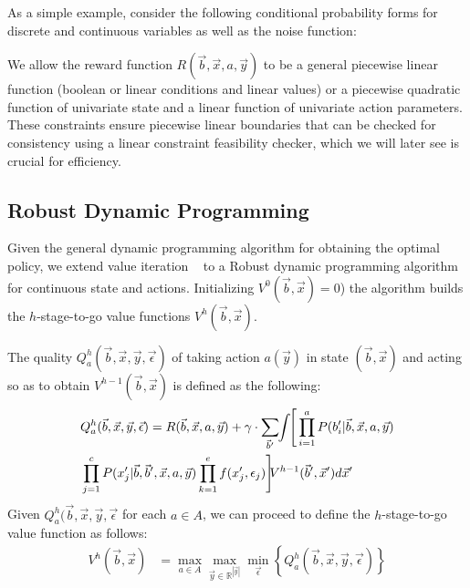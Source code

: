 As a simple example, consider the following conditional probability forms for discrete and continuous variables as well as the noise function: 

We allow the reward function $R(\vec{b},\vec{x},a,\vec{y})$ to be a general piecewise linear function (boolean or linear conditions
and linear values) or a piecewise quadratic function of univariate state and a linear function of univariate action parameters. 
These constraints ensure piecewise linear boundaries that can be checked for consistency using a linear constraint feasibility checker, which we will later see is crucial for efficiency.

\subsection{Robust Dynamic Programming}

Given the general dynamic programming algorithm for obtaining the optimal policy, we extend value iteration ~\cite{bellman} to a Robust dynamic programming algorithm for continuous state and actions. Initializing $V^0(\vec{b},\vec{x}) = 0$) the algorithm builds the $h$-stage-to-go value functions $V^h(\vec{b},\vec{x})$.

The quality $Q_a^{h}(\vec{b},\vec{x},\vec{y},\vec{\epsilon})$ of taking action $a(\vec{y})$ in state $(\vec{b},\vec{x})$ and acting so as to obtain $V^{h-1}(\vec{b},\vec{x})$ is defined as the following:
\vspace{-4mm}
{\footnotesize
\begin{align}
& Q_a^{h}(\vec{b},\vec{x},\vec{y},\vec{\epsilon}) = R(\vec{b},\vec{x},a,\vec{y}) + \gamma \cdot \sum_{\vec{b}'} \hspace{-1.0mm} \int \hspace{-1.0mm} \Bigg[ \prod_{i=1}^a P(b_i'|\vec{b},\vec{x},a,\vec{y})     \nonumber \\ 
&\prod_{j=1}^c P(x_j'|\vec{b},\vec{b}',\vec{x},a,\vec{y}) \prod_{k=1}^e f(x_j',\epsilon_j)\Bigg]  \hspace{-1.0mm} V^{h-1}(\vec{b}',\vec{x}') d\vec{x}'  \hspace{-0.2mm} \label{eq:qfun} 
\end{align}}
Given $Q_a^h(\vec{b},\vec{x},\vec{y},\vec{\epsilon}$ for each $a \in A$, we can proceed
to define the $h$-stage-to-go value function as follows:
\begin{align}
V^{h}(\vec{b},\vec{x}) & = \max_{a \in A} \max_{\vec{y} \in \mathbb{R}^{|\vec{y}|}} \min_{\vec{\epsilon}} \left\{ Q^{h}_a(\vec{b},\vec{x},\vec{y},\vec{\epsilon}) \right\} \label{eq:vfun}
\end{align}

